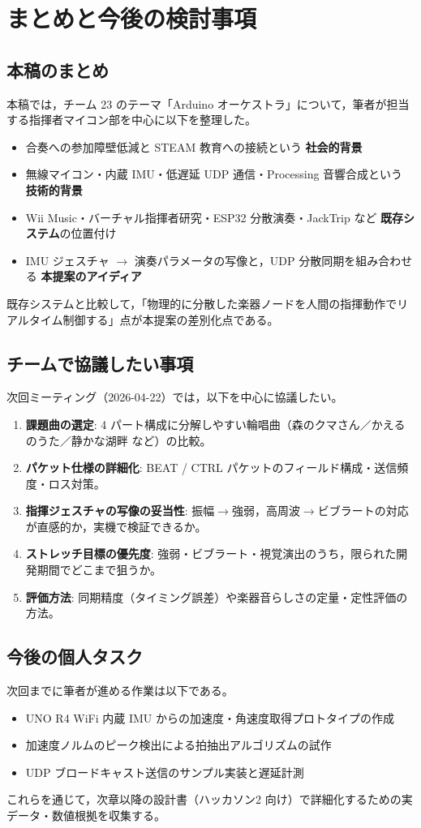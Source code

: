 \chapter{まとめと今後の検討事項}
\label{ch:conclusion}

\section{本稿のまとめ}

本稿では，チーム 23 のテーマ「Arduino オーケストラ」について，筆者が担当する指揮者マイコン部を中心に以下を整理した。

\begin{itemize}
  \item 合奏への参加障壁低減と STEAM 教育への接続という \textbf{社会的背景}
  \item 無線マイコン・内蔵 IMU・低遅延 UDP 通信・Processing 音響合成という \textbf{技術的背景}
  \item Wii Music・バーチャル指揮者研究・ESP32 分散演奏・JackTrip など \textbf{既存システム}の位置付け
  \item IMU ジェスチャ $\rightarrow$ 演奏パラメータの写像と，UDP 分散同期を組み合わせる \textbf{本提案のアイディア}
\end{itemize}

既存システムと比較して，「物理的に分散した楽器ノードを人間の指揮動作でリアルタイム制御する」点が本提案の差別化点である。

\section{チームで協議したい事項}

次回ミーティング（2026-04-22）では，以下を中心に協議したい。

\begin{enumerate}
  \item \textbf{課題曲の選定}: 4 パート構成に分解しやすい輪唱曲（森のクマさん／かえるのうた／静かな湖畔 など）の比較。
  \item \textbf{パケット仕様の詳細化}: BEAT / CTRL パケットのフィールド構成・送信頻度・ロス対策。
  \item \textbf{指揮ジェスチャの写像の妥当性}: 振幅$\rightarrow$強弱，高周波$\rightarrow$ビブラートの対応が直感的か，実機で検証できるか。
  \item \textbf{ストレッチ目標の優先度}: 強弱・ビブラート・視覚演出のうち，限られた開発期間でどこまで狙うか。
  \item \textbf{評価方法}: 同期精度（タイミング誤差）や楽器音らしさの定量・定性評価の方法。
\end{enumerate}

\section{今後の個人タスク}

次回までに筆者が進める作業は以下である。

\begin{itemize}
  \item UNO R4 WiFi 内蔵 IMU からの加速度・角速度取得プロトタイプの作成
  \item 加速度ノルムのピーク検出による拍抽出アルゴリズムの試作
  \item UDP ブロードキャスト送信のサンプル実装と遅延計測
\end{itemize}

これらを通じて，次章以降の設計書（ハッカソン2 向け）で詳細化するための実データ・数値根拠を収集する。
